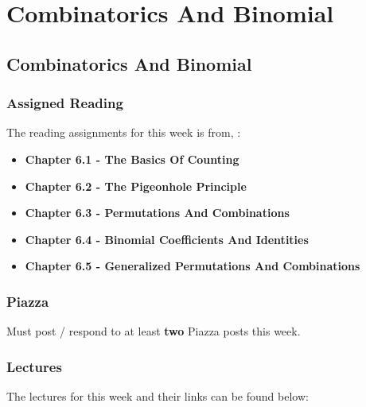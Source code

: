 \clearpage

\renewcommand{\ChapTitle}{Combinatorics And Binomial}
\renewcommand{\SectionTitle}{Combinatorics And Binomial}

\chapter{\ChapTitle}
\section{\SectionTitle}

\subsection{Assigned Reading}

The reading assignments for this week is from, \Textbook:

\begin{itemize}
    \item \textbf{Chapter 6.1 - The Basics Of Counting}
    \item \textbf{Chapter 6.2 - The Pigeonhole Principle}
    \item \textbf{Chapter 6.3 - Permutations And Combinations}
    \item \textbf{Chapter 6.4 - Binomial Coefficients And Identities}
    \item \textbf{Chapter 6.5 - Generalized Permutations And Combinations}
\end{itemize}

\subsection{Piazza}

Must post / respond to at least \textbf{two} Piazza posts this week.

\subsection{Lectures}

The lectures for this week and their links can be found below:

